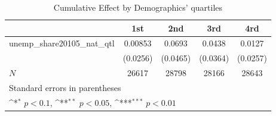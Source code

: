 \begin{table}[htbp]\centering
\def\sym#1{\ifmmode^{#1}\else\(^{#1}\)\fi}
\caption{Cumulative Effect by Demographics' quartiles}
\begin{tabular}{l*{4}{c}}
\hline\hline
            &\multicolumn{1}{c}{1st}&\multicolumn{1}{c}{2nd}&\multicolumn{1}{c}{3rd}&\multicolumn{1}{c}{4rd}\\
\hline
unemp\_share20105\_nat\_qtl&     0.00853         &      0.0693         &      0.0438         &      0.0127         \\
            &    (0.0256)         &    (0.0465)         &    (0.0364)         &    (0.0257)         \\
\hline
\(N\)       &       26617         &       28798         &       28166         &       28643         \\
\hline\hline
\multicolumn{5}{l}{\footnotesize Standard errors in parentheses}\\
\multicolumn{5}{l}{\footnotesize \sym{*} \(p<0.1\), \sym{**} \(p<0.05\), \sym{***} \(p<0.01\)}\\
\end{tabular}
\end{table}
